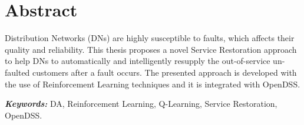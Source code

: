 

\chapter*{Abstract}


Distribution Networks (DNs) are highly susceptible to faults, which affects their quality and reliability. This thesis proposes a novel Service Restoration approach to help DNs to automatically and intelligently resupply the out-of-service un-faulted customers after a fault occurs. The presented approach is developed with the use of Reinforcement Learning techniques and it is integrated with OpenDSS. 

\vspace*{5ex}
\textbf{\textit{Keywords:}} DA, Reinforcement Learning, Q-Learning, Service Restoration, OpenDSS.

